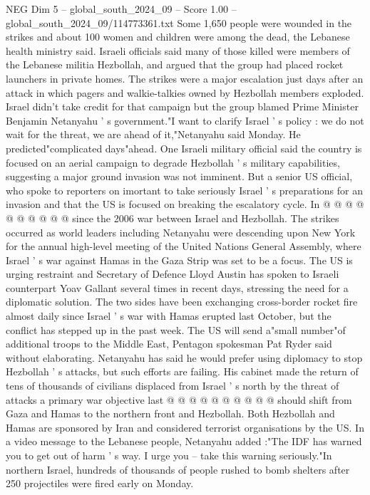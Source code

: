 \begin{textsample}{NEG Dim 5 – global\_south\_2024\_09 – Score 1.00 – global\_south\_2024\_09/114773361.txt}  \label{ex:f5_neg_223}
Some 1,650 people were wounded in the strikes and about 100 women and children were among the dead, the Lebanese health ministry said.
Israeli officials said many of those killed were members of the Lebanese militia Hezbollah, and argued that the group had placed rocket launchers in private homes.
The strikes were a major escalation just days after an attack in which pagers and walkie-talkies owned by Hezbollah members exploded.
Israel didn't take credit for that campaign but the group blamed Prime Minister Benjamin Netanyahu ' s government."I want to clarify Israel ' s policy : we do not wait for the threat, we are ahead of it,"Netanyahu said Monday.
He predicted"complicated days"ahead.
One Israeli military official said the country is focused on an aerial campaign to degrade Hezbollah ' s military capabilities, suggesting a major ground invasion was not imminent.
But a senior US official, who spoke to reporters on imortant to take seriously Israel ' s preparations for an invasion and that the US is focused on breaking the escalatory cycle.
In @ @ @ @ @ @ @ @ @ @ since the 2006 war between Israel and Hezbollah.
The strikes occurred as world leaders including Netanyahu were descending upon New York for the annual high-level meeting of the United Nations General Assembly, where Israel ' s war against Hamas in the Gaza Strip was set to be a focus.
The US is urging restraint and Secretary of Defence Lloyd Austin has spoken to Israeli counterpart Yoav Gallant several times in recent days, stressing the need for a diplomatic solution.
The two sides have been exchanging cross-border rocket fire almost daily since Israel ' s war with Hamas erupted last October, but the conflict has stepped up in the past week.
The US will send a"small number"of additional troops to the Middle East, Pentagon spokesman Pat Ryder said without elaborating.
Netanyahu has said he would prefer using diplomacy to stop Hezbollah ' s attacks, but such efforts are failing.
His cabinet made the return of tens of thousands of civilians displaced from Israel ' s north by the threat of attacks a primary war objective last @ @ @ @ @ @ @ @ @ @ should shift from Gaza and Hamas to the northern front and Hezbollah.
Both Hezbollah and Hamas are sponsored by Iran and considered terrorist organisations by the US.
In a video message to the Lebanese people, Netanyahu added :"The IDF has warned you to get out of harm ' s way.
I urge you -- take this warning seriously."In northern Israel, hundreds of thousands of people rushed to bomb shelters after 250 projectiles were fired early on Monday.

\end{textsample}

